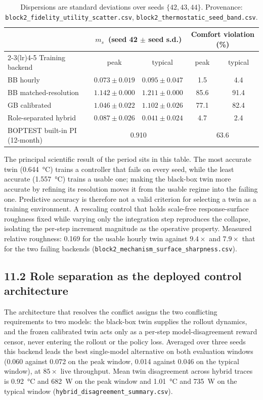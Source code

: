 \documentclass[11pt,a4paper]{article}
\newcommand{\ms}{\ensuremath{m_s}}
\begin{document}
\begin{table}[h]
\centering\small
\begin{tabular}{@{}lcccc@{}}
\toprule
& \multicolumn{2}{c}{\ms\ (seed 42 $\pm$ seed s.d.)} & \multicolumn{2}{c}{Comfort violation (\%)} \\
\cmidrule(lr){2-3}\cmidrule(lr){4-5}
Training backend & peak & typical & peak & typical \\
\midrule
BB hourly & $0.073 \pm 0.019$ & $0.095 \pm 0.047$ & 1.5 & 4.4 \\
BB matched-resolution & $1.142 \pm 0.000$ & $1.211 \pm 0.000$ & 85.6 & 91.4 \\
GB calibrated & $1.046 \pm 0.022$ & $1.102 \pm 0.026$ & 77.1 & 82.4 \\
Role-separated hybrid & $\mathbf{0.087 \pm 0.026}$ & $\mathbf{0.041 \pm 0.024}$ & 4.7 & 2.4 \\
\midrule
BOPTEST built-in PI (12-month) & \multicolumn{2}{c}{0.910} & \multicolumn{2}{c}{63.6} \\
\bottomrule
\end{tabular}
\caption*{\small Dispersions are standard deviations over seeds $\{42,43,44\}$. Provenance:
\texttt{block2\_fidelity\_utility\_scatter.csv}, \texttt{block2\_thermostatic\_seed\_band.csv}.}
\end{table}

The principal scientific result of the period sits in this table. The most accurate twin
(\SI{0.644}{\celsius}) trains a controller that fails on every seed, while the least accurate
(\SI{1.557}{\celsius}) trains a usable one; making the black-box twin more accurate by refining
its resolution moves it from the usable regime into the failing one. Predictive accuracy is
therefore not a valid criterion for selecting a twin as a training environment. A rescaling
control that holds scale-free response-surface roughness fixed while varying only the integration
step reproduces the collapse, isolating the per-step increment magnitude as the operative
property. Measured relative roughness: 0.169 for the usable hourly twin against $9.4\times$ and
$7.9\times$ that for the two failing backends
(\texttt{block2\_mechanism\_surface\_sharpness.csv}).

\subsection*{11.2 Role separation as the deployed control architecture}

The architecture that resolves the conflict assigns the two conflicting requirements to two
models: the black-box twin supplies the rollout dynamics, and the frozen calibrated twin acts
only as a per-step model-disagreement reward censor, never entering the rollout or the policy
loss. Averaged over three seeds this backend leads the best single-model alternative on both
evaluation windows (0.060 against 0.072 on the peak window, 0.014 against 0.046 on the typical
window), at $85\times$ live throughput. Mean twin disagreement across hybrid traces is
\SI{0.92}{\celsius} and \SI{682}{\watt} on the peak window and \SI{1.01}{\celsius} and
\SI{735}{\watt} on the typical window (\texttt{hybrid\_disagreement\_summary.csv}).
\end{document}
